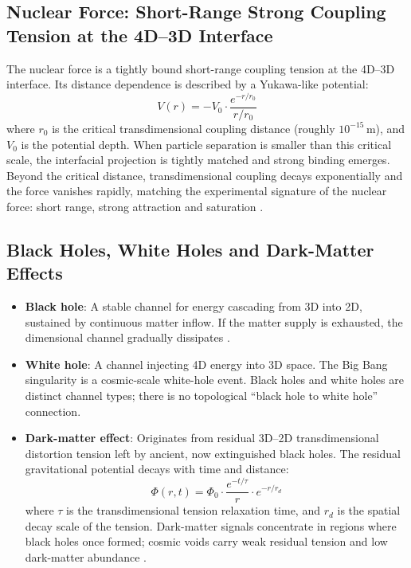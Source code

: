 \documentclass[12pt,a4paper]{article}
\begin{document}
\subsection{Nuclear Force: Short-Range Strong Coupling Tension at the 4D–3D Interface}
The nuclear force is a tightly bound short-range coupling tension at the 4D–3D interface. Its distance dependence is described by a Yukawa-like potential:
\begin{equation}
V(r) = -V_0 \cdot \frac{e^{-r/r_0}}{r/r_0}
\end{equation}
where $r_0$ is the critical transdimensional coupling distance (roughly $10^{-15}\,\text{m}$), and $V_0$ is the potential depth. When particle separation is smaller than this critical scale, the interfacial projection is tightly matched and strong binding emerges. Beyond the critical distance, transdimensional coupling decays exponentially and the force vanishes rapidly, matching the experimental signature of the nuclear force: short range, strong attraction and saturation \cite{yukawa1935, halzen1984}.

\subsection{Black Holes, White Holes and Dark-Matter Effects}
\begin{itemize}
\item \textbf{Black hole}: A stable channel for energy cascading from 3D into 2D, sustained by continuous matter inflow. If the matter supply is exhausted, the dimensional channel gradually dissipates \cite{hawking1974, chandrasekhar1983}.
\item \textbf{White hole}: A channel injecting 4D energy into 3D space. The Big Bang singularity is a cosmic-scale white-hole event. Black holes and white holes are distinct channel types; there is no topological “black hole to white hole” connection.
\item \textbf{Dark-matter effect}: Originates from residual 3D–2D transdimensional distortion tension left by ancient, now extinguished black holes. The residual gravitational potential decays with time and distance:
\begin{equation}
\Phi(r,t) = \Phi_0 \cdot \frac{e^{-t/\tau}}{r} \cdot e^{-r/r_d}
\end{equation}
where $\tau$ is the transdimensional tension relaxation time, and $r_d$ is the spatial decay scale of the tension. Dark-matter signals concentrate in regions where black holes once formed; cosmic voids carry weak residual tension and low dark-matter abundance \cite{rubin1980, bertone2005}.
\end{itemize}
\end{document}
